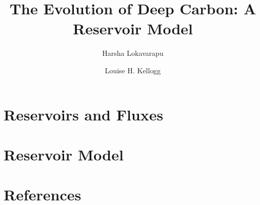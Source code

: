 \documentclass[review]{elsarticle}
\begin{document}
\begin{frontmatter}
\title{\textbf{The Evolution of Deep Carbon: A Reservoir Model}}
\address[address1]{Department of Earth and Planetary Sciences, University of California, Davis, CA 95616, USA}

\author[address1]{Harsha Lokavarapu }

\author[address1]{Louise H. Kellogg}
\date{}
\begin{abstract}

\end{abstract}
\end{frontmatter}

\section{Reservoirs and Fluxes}


\section{Reservoir Model}

\newpage
\section*{References}
 

\end{document}
